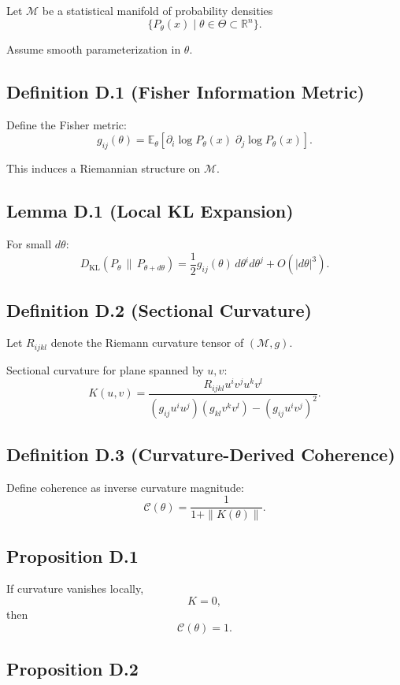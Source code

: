 \documentclass[12pt]{article}
\begin{document}
Let $\mathcal{M}$ be a statistical manifold of probability densities 
\[
\{ P_\theta(x) \mid \theta \in \Theta \subset \mathbb{R}^n \}.
\]

Assume smooth parameterization in $\theta$.

\subsection*{Definition D.1 (Fisher Information Metric)}

Define the Fisher metric:
\[
g_{ij}(\theta)
=
\mathbb{E}_\theta
\left[
\partial_i \log P_\theta(x)
\;
\partial_j \log P_\theta(x)
\right].
\]

This induces a Riemannian structure on $\mathcal{M}$.

\subsection*{Lemma D.1 (Local KL Expansion)}

For small $d\theta$:
\[
D_{\mathrm{KL}}(P_\theta \,\|\, P_{\theta + d\theta})
=
\frac{1}{2}
g_{ij}(\theta)
\, d\theta^i d\theta^j
+
O(|d\theta|^3).
\]

\subsection*{Definition D.2 (Sectional Curvature)}

Let $R_{ijkl}$ denote the Riemann curvature tensor of $(\mathcal{M}, g)$.

Sectional curvature for plane spanned by $u, v$:
\[
K(u,v)
=
\frac{
R_{ijkl} u^i v^j u^k v^l
}{
(g_{ij} u^i u^j)(g_{kl} v^k v^l) - (g_{ij} u^i v^j)^2
}.
\]

\subsection*{Definition D.3 (Curvature-Derived Coherence)}

Define coherence as inverse curvature magnitude:
\[
\mathcal{C}(\theta)
=
\frac{1}{1 + \|K(\theta)\|}.
\]

\subsection*{Proposition D.1}

If curvature vanishes locally,
\[
K = 0,
\]
then
\[
\mathcal{C}(\theta) = 1.
\]

\subsection*{Proposition D.2}
\end{document}
